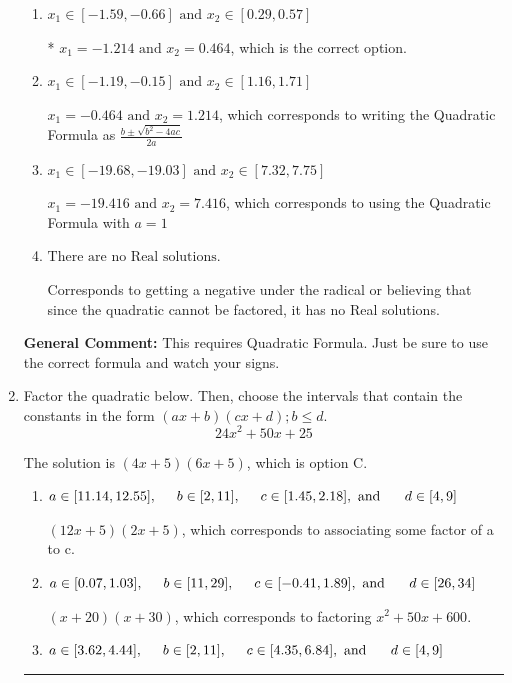 \documentclass{extbook}[14pt]
\newcommand{\litem}[1]{\item #1

\rule{\textwidth}{0.4pt}}
\begin{document}
\begin{enumerate}
{\begin{enumerate}[label=\Alph*.]
 $x_1 = -27.208 \text{ and } x_2 = 26.458$, which corresponds to writing the Quadratic Formula as $-\frac{b}{2a} \pm \sqrt{b^2 - 4ac}$.
\item \( x_1 \in [-1.59, -0.66] \text{ and } x_2 \in [0.29, 0.57] \)

* $x_1 = -1.214 \text{ and } x_2 = 0.464$, which is the correct option.
\item \( x_1 \in [-1.19, -0.15] \text{ and } x_2 \in [1.16, 1.71] \)

 $x_1 = -0.464 \text{ and } x_2 = 1.214$, which corresponds to writing the Quadratic Formula as $\frac{b \pm \sqrt{b^2 - 4ac}}{2a}$
\item \( x_1 \in [-19.68, -19.03] \text{ and } x_2 \in [7.32, 7.75] \)

 $x_1 = -19.416 \text{ and } x_2 = 7.416$, which corresponds to using the Quadratic Formula with $a=1$
\item \( \text{There are no Real solutions.} \)

Corresponds to getting a negative under the radical or believing that since the quadratic cannot be factored, it has no Real solutions.
\end{enumerate}

\textbf{General Comment:} This requires Quadratic Formula. Just be sure to use the correct formula and watch your signs.
}
\litem{
Factor the quadratic below. Then, choose the intervals that contain the constants in the form $(ax+b)(cx+d); b \leq d.$
\[ 24x^{2} +50 x + 25 \]

The solution is \( (4x + 5)(6x + 5) \), which is option C.\begin{enumerate}[label=\Alph*.]
\item \( a \in [11.14, 12.55], \hspace*{5mm} b \in [2, 11], \hspace*{5mm} c \in [1.45, 2.18], \text{ and } \hspace*{5mm} d \in [4, 9] \)

 $(12x + 5)(2x + 5)$, which corresponds to associating some factor of a to c.
\item \( a \in [0.07, 1.03], \hspace*{5mm} b \in [11, 29], \hspace*{5mm} c \in [-0.41, 1.89], \text{ and } \hspace*{5mm} d \in [26, 34] \)

 $(x + 20)(x + 30)$, which corresponds to factoring $x^{2} +50 x + 600$.
\item \( a \in [3.62, 4.44], \hspace*{5mm} b \in [2, 11], \hspace*{5mm} c \in [4.35, 6.84], \text{ and } \hspace*{5mm} d \in [4, 9] \)


\end{enumerate}}
\end{enumerate}
\end{document}
